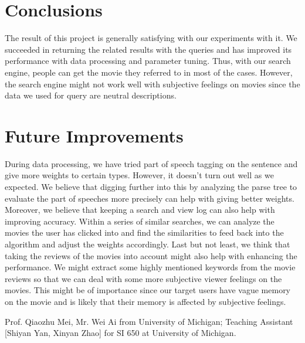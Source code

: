 \documentclass[sigconf,nonacm]{acmart}
\begin{document}
\section{Conclusions}

The result of this project is generally satisfying with our experiments with
it. We succeeded in returning the related results with the queries and has
improved its performance with data processing and parameter tuning. Thus,
with our search engine, people can get the movie they referred to in most of the cases.
However, the search engine might not work well with subjective feelings on
movies since the data we used for query are neutral descriptions.

\section{Future Improvements}
During data processing, we have tried part of speech tagging on the sentence and give more weights to certain types. However, it doesn’t turn out well as we expected. We believe that digging further into this by analyzing the parse tree to evaluate the part of speeches more precisely can help with giving better weights.
Moreover, we believe that keeping a search and view log can also help with improving accuracy. Within a series of similar searches, we can analyze the movies the user has clicked into and find the similarities to feed back into the algorithm and adjust the weights accordingly.
Last but not least, we think that taking the reviews of the movies into account might also help with enhancing the performance. We might extract some highly mentioned keywords from the movie reviews so that we can deal with some more subjective viewer feelings on the movies. This might be of importance since our target users have vague memory on the movie and is likely that their memory is affected by subjective feelings.

\begin{acks}
  Prof. Qiaozhu Mei, Mr. Wei Ai from University of Michigan;
  Teaching Assistant [Shiyan Yan, Xinyan Zhao] for SI 650 at University of Michigan.
\end{acks}






\end{document}
